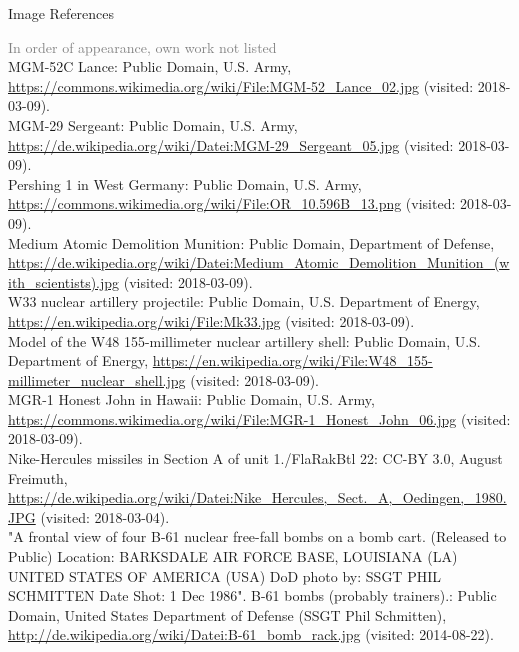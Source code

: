 \documentclass[presentation]{beamer}
\begin{document}
\appendix
\begin{frame}[label={sec:org0da5b12}]{Image References}
\tiny 

\textcolor{gray}{In order of appearance, own work not listed}\\[0.5em]

MGM-52C Lance: Public Domain, U.S. Army, \url{https://commons.wikimedia.org/wiki/File:MGM-52_Lance_02.jpg} (visited: 2018-03-09).\\[0.3em]

MGM-29 Sergeant: Public Domain, U.S. Army, \url{https://de.wikipedia.org/wiki/Datei:MGM-29_Sergeant_05.jpg} (visited: 2018-03-09).\\[0.3em]

Pershing 1 in West Germany: Public Domain, U.S. Army, \url{https://commons.wikimedia.org/wiki/File:OR_10.596B_13.png} (visited: 2018-03-09).\\[0.3em]
   
Medium Atomic Demolition Munition: Public Domain, Department of Defense, \url{https://de.wikipedia.org/wiki/Datei:Medium_Atomic_Demolition_Munition_(with_scientists).jpg} (visited: 2018-03-09).\\[0.3em]

W33 nuclear artillery projectile: Public Domain, U.S. Department of Energy, \url{https://en.wikipedia.org/wiki/File:Mk33.jpg} (visited: 2018-03-09).\\[0.3em]

Model of the W48 155-millimeter nuclear artillery shell: Public Domain, U.S. Department of Energy, \url{https://en.wikipedia.org/wiki/File:W48_155-millimeter_nuclear_shell.jpg} (visited: 2018-03-09).\\[0.3em]

MGR-1 Honest John in Hawaii: Public Domain, U.S. Army, \url{https://commons.wikimedia.org/wiki/File:MGR-1_Honest_John_06.jpg} (visited: 2018-03-09).\\[0.3em]

Nike-Hercules missiles in Section A of unit 1./FlaRakBtl 22: CC-BY 3.0, August Freimuth, \url{https://de.wikipedia.org/wiki/Datei:Nike_Hercules,_Sect._A,_Oedingen,_1980.JPG} (visited: 2018-03-04).\\[0.3em]

"A frontal view of four B-61 nuclear free-fall bombs on a bomb cart. (Released to Public) Location: BARKSDALE AIR FORCE BASE, LOUISIANA (LA) UNITED STATES OF AMERICA (USA) DoD photo by: SSGT PHIL SCHMITTEN Date Shot: 1 Dec 1986". B-61 bombs (probably trainers).: Public Domain, United States Department of Defense (SSGT Phil Schmitten), \url{http://de.wikipedia.org/wiki/Datei:B-61_bomb_rack.jpg} (visited: 2014-08-22).\\[0.3em]
\end{frame}
\end{document}
